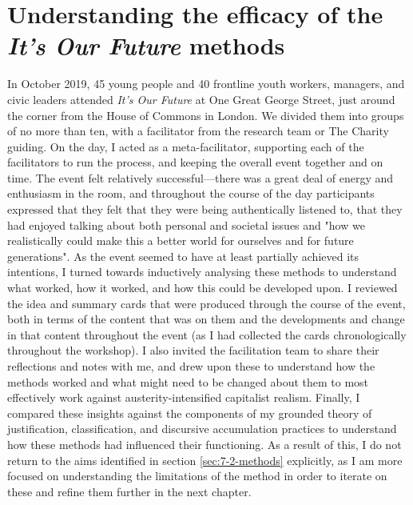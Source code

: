 \section{Understanding the efficacy of the \textit{It's Our Future} methods}
\label{sec:7-6-understanding}
In October 2019, 45 young people and 40 frontline youth workers, managers, and civic leaders attended \textit{It's Our Future} at One Great George Street, just around the corner from the House of Commons in London. We divided them into groups of no more than ten, with a facilitator from the research team or The Charity guiding. On the day, I acted as a meta-facilitator, supporting each of the facilitators to run the process, and keeping the overall event together and on time. The event felt relatively successful—there was a great deal of energy and enthusiasm in the room, and throughout the course of the day participants expressed that they felt that they were being authentically listened to, that they had enjoyed talking about both personal and societal issues and "how we realistically could make this a better world for ourselves and for future generations". As the event seemed to have at least partially achieved its intentions, I turned towards inductively analysing these methods to understand what worked, how it worked, and how this could be developed upon. I reviewed the idea and summary cards that were produced through the course of the event, both in terms of the content that was on them and the developments and change in that content throughout the event (as I had collected the cards chronologically throughout the workshop). I also invited the facilitation team to share their reflections and notes with me, and drew upon these to understand how the methods worked and what might need to be changed about them to most effectively work against austerity-intensified capitalist realism. Finally, I compared these insights against the components of my grounded theory of justification, classification, and discursive accumulation practices to understand how these methods had influenced their functioning. As a result of this, I do not return to the aims identified in section \ref{sec:7-2-methods} explicitly, as I am more focused on understanding the limitations of the method in order to iterate on these and refine them further in the next chapter.

